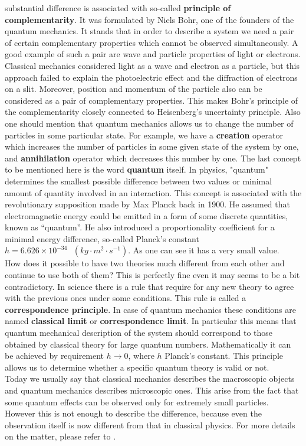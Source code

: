 \documentclass[twoside,english]{uiofysmaster}
\theoremstyle{definition}
\begin{document}
substantial difference is associated with so-called \textbf{principle of complementarity}. It was formulated by  Niels Bohr, one of the founders of the quantum mechanics. It stands that in order to describe a system we need a pair of certain complementary properties which cannot be observed simultaneously. A good example of such a pair are wave and particle properties of light or electrons. Classical mechanics considered light as a wave and electron as a particle, but this approach failed to explain the photoelectric effect and the diffraction of electrons on a slit. Moreover, position and momentum of the particle also can be considered as a pair of complementary properties. This makes Bohr's principle of the complementarity closely connected to Heisenberg's uncertainty principle. Also one should mention that quantum mechanics allows us to change the number of particles in some particular state. For example, we have a \textbf{creation} operator which increases the number of particles in some given state of the system by one, and \textbf{annihilation} operator which decreases this number by one. The last concept to be mentioned here is the word \textbf{quantum} itself. In physics, "quantum" determines the smallest possible difference between two values or minimal amount of quantity involved in an interaction. This concept is associated with the revolutionary supposition made by Max Planck back in 1900. He assumed that electromagnetic energy could be emitted in a form of some discrete quantities, known as “quantum”. He also introduced a proportionality coefficient for a minimal energy difference, so-called Planck's constant $h = 6.626 \times 10^{-34} \text{ } (kg \cdot m^2\cdot s^{-1})$. As one can see it has a very small value.  \\
How does it possible to have two theories much different from each other and continue to use both of them? This is perfectly fine even it may seems to be a bit contradictory. In science there is a rule that require for any new theory to agree with the previous ones under some conditions. This rule is called a \textbf{correspondence principle}. In case of quantum mechanics these conditions are named \textbf{classical limit} or \textbf{correspondence limit}. In particular this means that quantum mechanical description of the system should correspond to those obtained by classical theory for large quantum numbers. Mathematically it can be achieved by requirement $h \rightarrow 0$, where $h$ Planck's constant. This principle allows us to determine whether a specific quantum theory is valid or not.\\
Today we usually say that classical mechanics describes the macroscopic objects and quantum mechanics describes microscopic ones. This arise from the fact that some quantum effects can be observed only for extremely small particles. However this is not enough to describe the difference, because even the observation itself is now different from that in classical physics. 
For more details on the matter, please refer to \cite{phillipsIntroductionQuantumMechanics2003}. \\
\end{document}
